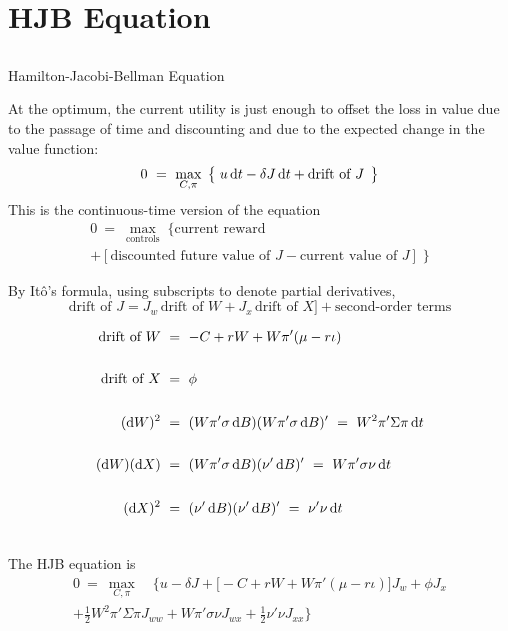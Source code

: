 \documentclass[xcolor=dvipsnames,10pt]{beamer}
\begin{document}
\section{HJB Equation}\subsection{}
\begin{frame}{Hamilton-Jacobi-Bellman Equation}

 At the optimum, the current utility is just enough to offset the loss in value due to the passage of time and discounting and due to the expected change in the value function:
$$ 0 \ = \ \max_{C,\pi} \;\big\{ \; u\,\D t - \delta J\,\D t + \text{drift of $J$}\;\,\big\}
$$
This is the continuous-time version of the equation
\begin{multline*}
    0 \ = \ \max_{\text{controls}} \; \big\{ \text{current reward} \\+ [\text{discounted future value of $J$} - \text{current value of $J$}] \;\big\}
\end{multline*}

 By It\^o's formula, using subscripts to denote partial derivatives,
$$
\text{drift of $J$} = J_w \,\text{drift of $W$} + J_x \,\text{drift of $X$}] + \text{second-order terms}
$$
\end{frame}

\begin{frame}
\begin{align*}
\text{drift of $W$} \ &= \ -C + rW + W\pi'(\mu - r\iota)\\ \\ 
\text{drift of $X$} \ &= \ \phi\ \\ \\
(\D W)^2 \ &= \ (W \pi'\sigma\,\D B)(W\pi'\sigma\,\D B)' \ = \ W^2\pi'\Sigma\pi\,\D t\\ \\ 
(\D W)(\D X) \ &= \  (W\pi'\sigma \,\D B)(\nu'\,\D B)' \ = \ W\pi'\sigma\nu\,\D t\\ \\
  (\D X)^2 \ &= \ (\nu'\,\D B)(\nu'\,\D B)' \ = \ \nu'\nu\,\D t\\ \\ 
\end{align*}
\end{frame}

\begin{frame}
The HJB equation is
\begin{multline*} 0 \ = \ \max_{C,\pi} \quad \bigg\{u - \delta J + \big[-C + rW + W\pi'(\mu - r\iota)\big]J_w + \phi J_x \\
+ \frac{1}{2}W^2\pi'\Sigma\pi J_{ww} + W\pi'\sigma\nu J_{wx} 
+ \frac{1}{2}\nu'\nu J_{xx} \bigg\}
\end{multline*}

\end{frame}
\end{document}
